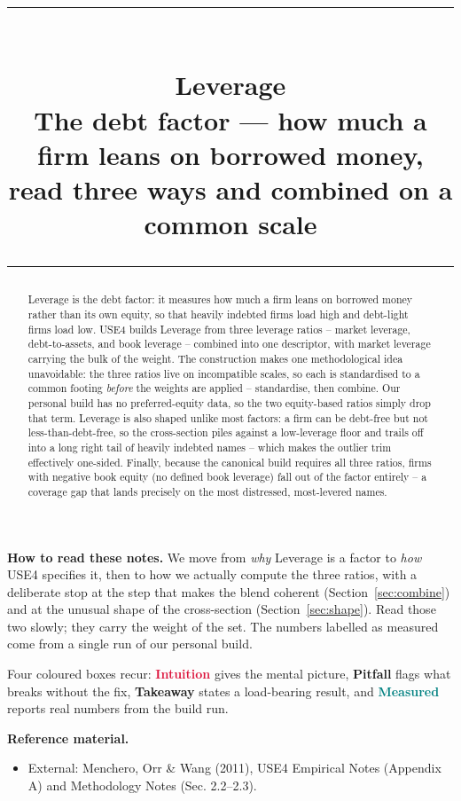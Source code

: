 \documentclass[11pt]{article}
\title{\vspace{-2.2em}
  {\color{steel}\rule{\textwidth}{1.3pt}}\\[0.7em]
  \Huge\bfseries Leverage\\[0.35em]
  \large\mdseries The debt factor --- how much a firm leans on borrowed money, read three ways and combined on a common scale\\[0.4em]
  {\color{steel}\rule{\textwidth}{0.7pt}}}
\author{}
\date{}
\theoremstyle{definition}
\theoremstyle{plain}
\theoremstyle{remark}
\begin{document}
\maketitle
\thispagestyle{empty}

\begin{abstract}
Leverage is the debt factor: it measures how much a firm leans on borrowed money rather than its own equity, so that heavily indebted firms load high and debt-light firms load low. USE4 builds Leverage from three leverage ratios -- market leverage, debt-to-assets, and book leverage -- combined into one descriptor, with market leverage carrying the bulk of the weight. The construction makes one methodological idea unavoidable: the three ratios live on incompatible scales, so each is standardised to a common footing \emph{before} the weights are applied -- standardise, then combine. Our personal build has no preferred-equity data, so the two equity-based ratios simply drop that term. Leverage is also shaped unlike most factors: a firm can be debt-free but not less-than-debt-free, so the cross-section piles against a low-leverage floor and trails off into a long right tail of heavily indebted names -- which makes the outlier trim effectively one-sided. Finally, because the canonical build requires all three ratios, firms with negative book equity (no defined book leverage) fall out of the factor entirely -- a coverage gap that lands precisely on the most distressed, most-levered names.
\end{abstract}

\begin{tcolorbox}[colback=paperlt,colframe=ink!30,boxrule=0.4pt,arc=2pt,left=10pt,right=10pt,top=8pt,bottom=8pt]
\textbf{How to read these notes.} We move from \emph{why} Leverage is a factor to \emph{how} USE4 specifies it, then to how we actually compute the three ratios, with a deliberate stop at the step that makes the blend coherent (Section~\ref{sec:combine}) and at the unusual shape of the cross-section (Section~\ref{sec:shape}). Read those two slowly; they carry the weight of the set. The numbers labelled as measured come from a single run of our personal build.

\smallskip
Four coloured boxes recur: \textcolor{crimson}{\textbf{Intuition}} gives the mental picture, \textcolor{amber}{\textbf{Pitfall}} flags what breaks without the fix, \textcolor{steel}{\textbf{Takeaway}} states a load-bearing result, and \textcolor{teal}{\textbf{Measured}} reports real numbers from the build run.

\smallskip
\textbf{Reference material.}
\begin{itemize}[leftmargin=1.4em,topsep=2pt]
  \item External: Menchero, Orr \& Wang (2011), USE4 Empirical Notes (Appendix A) and Methodology Notes (Sec. 2.2--2.3).
\end{itemize}
\end{tcolorbox}
\end{document}
